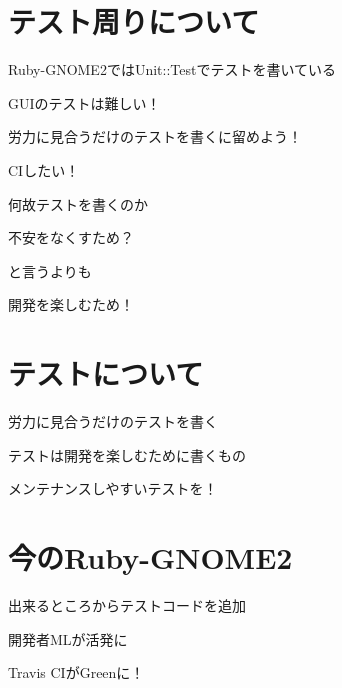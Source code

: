 \section{テスト周りについて}
\begin{frame}
\begin{itemize}
{\huge
\item{} Ruby-GNOME2ではUnit::Testでテストを書いている
\item{} GUIのテストは難しい！
\item{} 労力に見合うだけのテストを書くに留めよう！
\item{} CIしたい！
}
\end{itemize}
\end{frame}

\begin{frame}
\begin{center}
{\Huge
\item 何故テストを書くのか
}
\end{center}
\end{frame}

\begin{frame}
\begin{center}
{\Huge
\item 不安をなくすため？
}
\end{center}
\end{frame}

\begin{frame}
\begin{center}
{\Huge
\item と言うよりも
}
\end{center}
\end{frame}

\begin{frame}
\begin{center}
{\Huge
\item 開発を楽しむため！
}
\end{center}
\end{frame}

\section{テストについて}

\begin{frame}
\begin{itemize}
{\huge
\item{} 労力に見合うだけのテストを書く
\item{} テストは開発を楽しむために書くもの
\item{} メンテナンスしやすいテストを！
}
\end{itemize}
\end{frame}

\section{今のRuby-GNOME2}
\begin{frame}
\begin{itemize}
{\huge
\item 出来るところからテストコードを追加
\item 開発者MLが活発に
\item Travis CIがGreenに！
}
\end{itemize}
\end{frame}
